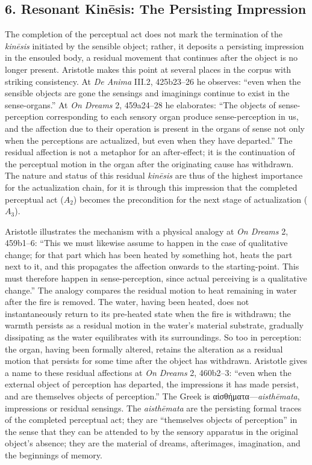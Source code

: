 \documentclass[12pt]{article}
\newcommand{\gk}[1]{{\greekfont #1}}%
\newcommand{\gk}[1]{{\greekfont #1}}%
\newcommand{\gk}[1]{#1}%
\begin{document}
\subsection*{6. Resonant Kinēsis: The Persisting Impression}

The completion of the perceptual act does not mark the termination of the \textit{kinēsis} initiated by the sensible object; rather, it deposits a persisting impression in the ensouled body, a residual movement that continues after the object is no longer present. Aristotle makes this point at several places in the corpus with striking consistency. At \textit{De Anima} III.2, 425b23--26 he observes: ``even when the sensible objects are gone the sensings and imaginings continue to exist in the sense-organs.'' At \textit{On Dreams} 2, 459a24--28 he elaborates: ``The objects of sense-perception corresponding to each sensory organ produce sense-perception in us, and the affection due to their operation is present in the organs of sense not only when the perceptions are actualized, but even when they have departed.'' The residual affection is not a metaphor for an after-effect; it is the continuation of the perceptual motion in the organ after the originating cause has withdrawn. The nature and status of this residual \textit{kinēsis} are thus of the highest importance for the actualization chain, for it is through this impression that the completed perceptual act ($A_2$) becomes the precondition for the next stage of actualization ($A_3$).

Aristotle illustrates the mechanism with a physical analogy at \textit{On Dreams} 2, 459b1--6: ``This we must likewise assume to happen in the case of qualitative change; for that part which has been heated by something hot, heats the part next to it, and this propagates the affection onwards to the starting-point. This must therefore happen in sense-perception, since actual perceiving is a qualitative change.'' The analogy compares the residual motion to heat remaining in water after the fire is removed. The water, having been heated, does not instantaneously return to its pre-heated state when the fire is withdrawn; the warmth persists as a residual motion in the water's material substrate, gradually dissipating as the water equilibrates with its surroundings. So too in perception: the organ, having been formally altered, retains the alteration as a residual motion that persists for some time after the object has withdrawn. Aristotle gives a name to these residual affections at \textit{On Dreams} 2, 460b2--3: ``even when the external object of perception has departed, the impressions it has made persist, and are themselves objects of perception.'' The Greek is \gk{αἰσθήματα}---\textit{aisthēmata}, impressions or residual sensings. The \textit{aisthēmata} are the persisting formal traces of the completed perceptual act; they are ``themselves objects of perception'' in the sense that they can be attended to by the sensory apparatus in the original object's absence; they are the material of dreams, afterimages, imagination, and the beginnings of memory.
\end{document}

